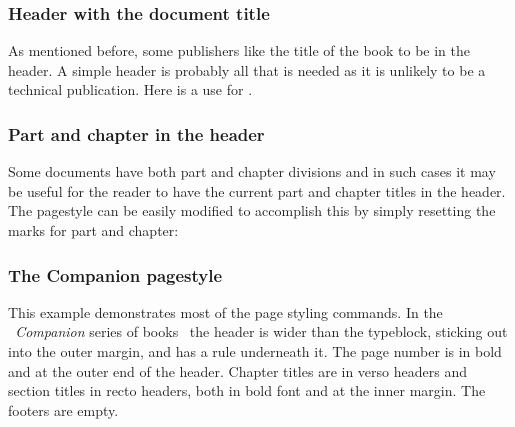 \subsubsection{Header with the document title}

    As mentioned before, some publishers like the title of the book 
to be in the header. A simple header is probably all that is needed 
as it is unlikely to be a technical publication. Here is a
use for .
\begin{lcode}
\end{lcode}

\subsubsection{Part and chapter in the header}

    Some documents have both part and chapter divisions and in such
cases it may be useful for the reader to have the current part and chapter
titles in the header. The  pagestyle can be easily modified
to accomplish this by simply resetting the marks for part and chapter:
\begin{lcode}
\end{lcode}
  

\subsubsection{The Companion pagestyle}

    This example demonstrates most of the page styling commands.
In the \textit{\ltx\ Companion} series of 
books~\cite{COMPANION,GCOMPANION,WCOMPANION} the header is wider 
than the typeblock, sticking out into the outer 
margin, and has a rule underneath it. 
The page number is in 
bold and at the outer end of the header.
Chapter titles are in verso headers and section titles 
in recto headers, both in bold font and at the inner 
margin. The footers are empty.

